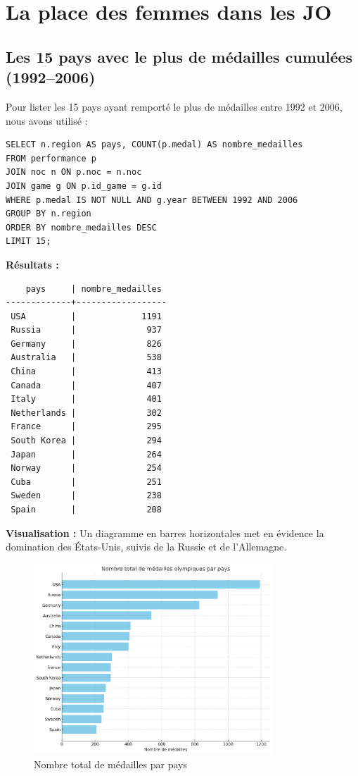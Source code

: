 \documentclass[fontsize=10pt,oneside]{scrreprt}
\begin{document}
\chapter{La place des femmes dans les JO}

\section{Les 15 pays avec le plus de médailles cumulées (1992–2006)}
Pour lister les 15 pays ayant remporté le plus de médailles entre 1992 et 2006, nous avons utilisé :
\begin{verbatim}
SELECT n.region AS pays, COUNT(p.medal) AS nombre_medailles
FROM performance p
JOIN noc n ON p.noc = n.noc
JOIN game g ON p.id_game = g.id
WHERE p.medal IS NOT NULL AND g.year BETWEEN 1992 AND 2006
GROUP BY n.region
ORDER BY nombre_medailles DESC
LIMIT 15;
\end{verbatim}
\textbf{Résultats :}
\begin{verbatim}
    pays     | nombre_medailles
-------------+------------------
 USA         |             1191
 Russia      |              937
 Germany     |              826
 Australia   |              538
 China       |              413
 Canada      |              407
 Italy       |              401
 Netherlands |              302
 France      |              295
 South Korea |              294
 Japan       |              264
 Norway      |              254
 Cuba        |              251
 Sweden      |              238
 Spain       |              208
\end{verbatim}
\textbf{Visualisation :} Un diagramme en barres horizontales met en évidence la domination des États-Unis, suivis de la Russie et de l'Allemagne.
\begin{figure}[H]
    \centering
    \includegraphics[width=0.8\textwidth]{charts/nombretotalmedaillesparpays.png}
    \caption{Nombre total de médailles par pays}
    \label{fig:total_medailles_pays}
\end{figure}
\end{document}
